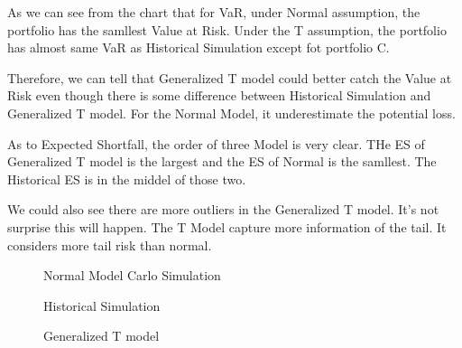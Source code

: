 \documentclass[11pt,en]{elegantpaper}
\begin{document}
As we can see from the chart that for VaR, under Normal assumption, the portfolio has the samllest Value at Risk. Under the T assumption, the portfolio has almost same VaR as Historical Simulation except fot portfolio C. 

Therefore, we can tell that Generalized T model could better catch the Value at Risk even though there is some difference between Historical Simulation and Generalized T model. For the Normal Model, it underestimate the potential loss.

As to Expected Shortfall, the order of three Model is very clear. THe ES of Generalized T model is the largest and the ES of Normal is the samllest. The Historical ES is in the middel of those two.


We could also see there are more outliers in the Generalized T model. It's not surprise this will happen. The T Model capture more information of the tail. It considers more tail risk than normal.

\newpage
\begin{figure}[htbp]
    \centering
    \quad
    \quad
    \quad
    \caption{Normal Model Carlo Simulation}
\end{figure}

\newpage
\begin{figure}[htbp]
    \centering
    \quad
    \quad
    \quad
    \caption{Historical Simulation}
\end{figure}

\newpage

\begin{figure}[htbp]
    \centering
    \quad
    \quad
    \quad
    \caption{Generalized T model}
\end{figure}
\end{document}
